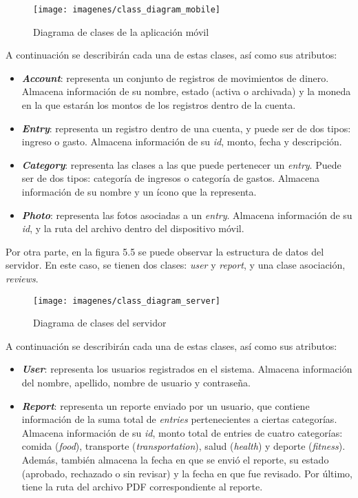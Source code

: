 \begin{figure}[ht]
  \centering
  \texttt{[image: imagenes/class\_diagram\_mobile]}
  \caption{Diagrama de clases de la aplicación móvil}
  \label{fig:classDiagramMobile}
\end{figure}

A continuación se describirán cada una de estas clases, así como sus atributos:

\begin{itemize}
	\item \textbf{\textit{Account}}: representa un conjunto de registros de movimientos de dinero. Almacena información de su nombre, estado (activa o archivada) y la moneda en la que estarán los montos de los registros dentro de la cuenta.
	\item \textbf{\textit{Entry}}: representa un registro dentro de una cuenta, y puede ser de dos tipos: ingreso o gasto. Almacena información de su \textit{id}, monto, fecha y descripción.
	\item \textbf{\textit{Category}}: representa las clases a las que puede pertenecer un \textit{entry}. Puede ser de dos tipos: categoría de ingresos o categoría de gastos. Almacena información de su nombre y un ícono que la representa.
	\item \textbf{\textit{Photo}}: representa las fotos asociadas a un \textit{entry}. Almacena información de su \textit{id}, y la ruta del archivo dentro del dispositivo móvil.
\end{itemize}

Por otra parte, en la figura 5.5 se puede observar la estructura de datos del servidor. En este caso, se tienen dos clases: \textit{user} y \textit{report}, y una clase asociación, \textit{reviews}.

\begin{figure}[ht]
  \centering
  \texttt{[image: imagenes/class\_diagram\_server]}
  \caption{Diagrama de clases del servidor}
  \label{fig:classDiagramServer}
\end{figure}

A continuación se describirán cada una de estas clases, así como sus atributos:

\begin{itemize}
	\item \textbf{\textit{User}}: representa los usuarios registrados en el sistema. Almacena información del nombre, apellido, nombre de usuario y contraseña.
	\item \textbf{\textit{Report}}: representa un reporte enviado por un usuario, que contiene información de la suma total de \textit{entries} pertenecientes a ciertas categorías. Almacena información de su \textit{id}, monto total de entries de cuatro categorías: comida (\textit{food}), transporte (\textit{transportation}), salud (\textit{health}) y deporte (\textit{fitness}). Además, también almacena la fecha en que se envió el reporte, su estado (aprobado, rechazado o sin revisar) y la fecha en que fue revisado. Por último, tiene la ruta del archivo PDF correspondiente al reporte.
\end{itemize} 

